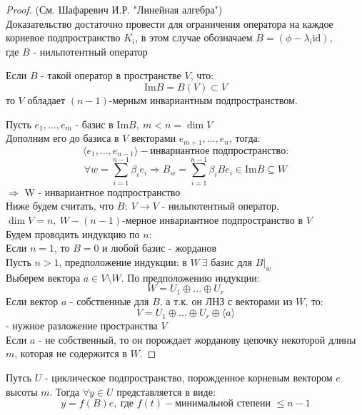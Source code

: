     \begin{proof} (См. Шафаревич И.Р. "Линейная алгебра")\\
        Доказательство достаточно провести для ограничения оператора на каждое корневое подпространство $K_i$, в этом случае обозначаем $B = (\phi - \lambda_i \text{id})$,\\ 
        где $B$ - нильпотентный оператор
        \begin{lemma}
            Если $B$ - такой оператор в пространстве $V$, что: 
            $$\text{Im}B = B(V) \subset V$$
            то $V$ обладает $(n-1)$-мерным инвариантным подпространством.     
        \end{lemma} 
        Пусть $e_1,...,e_m$ - базис в $\text{Im}B, \ m<n = \dim V$\\
        Дополним его до базиса в $V$ векторами $e_{m+1},...,e_n$, тогда:
        $$\langle e_1,...,e_{n-1} \rangle - \text{инвариантное подпространство:}$$
        $$\forall w = \sum \limits_{i=1}^{n-1}\beta_ie_i \Longrightarrow B_w = \sum \limits_{i=1}^{n-1}\beta_iBe_i \in \text{Im}B \subseteq W$$ 
        $\Longrightarrow $ W - инвариантное подпространство\\
        Ниже будем считать, что $B: \ V \to V$ - нильпотентный оператор, \\
        $\dim V = n, \ W - (n-1)$-мерное инвариантное подпространство в $V$\\
        Будем проводить индукцию по $n$:\\
        Если $n=1$, то $B = 0$ и любой базис - жорданов\\
        Пусть $n>1$, предположение индукции: в $W \ \exists$ базис для $B|_w$\\
        Выберем вектора $a \in V\setminus W$. По предположению индукции:
        $$W = U_1 \oplus ... \oplus U_r$$
        Если вектор $a$ - собственные для $B$, а т.к. он ЛНЗ с векторами из $W$, то: 
        $$V = U_1 \oplus ... \oplus U_r \oplus \langle a \rangle$$ 
        - нужное разложение пространства $V$\\
        Если $a$ - не собственный, то он порождает жорданову цепочку некоторой длины $m$, которая не содержится в $W$.          
    \end{proof}
    \begin{lemma}
        Путсь $U$ - циклическое подпространство, порожденное корневым вектором $e$ высоты $m$. Тогда $\forall y \in U$ представляется в виде:
        $$y = f(B)e, \ \text{где } f(t) - \text{минимальной степени } \leq n-1$$     
    \end{lemma}
